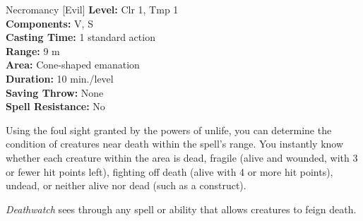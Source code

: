 {Necromancy [Evil]}
{
	\textbf{Level:}
	Clr 1, Tmp 1\\
	\textbf{Components:}
	V, S\\
	\textbf{Casting Time:}
	1 standard action\\
	\textbf{Range:}
	9 m\\
	\textbf{Area:}
	Cone-shaped emanation\\
	\textbf{Duration:}
	10 min./level\\
	\textbf{Saving Throw:}
	None\\
	\textbf{Spell Resistance:}
	No\\
}
{
	Using the foul sight granted by the powers of unlife, you can determine the condition of creatures near death within the spell's range. You instantly know whether each creature within the area is dead, fragile (alive and wounded, with 3 or fewer hit points left), fighting off death (alive with 4 or more hit points), undead, or neither alive nor dead (such as a construct).

	\emph{Deathwatch} sees through any spell or ability that allows creatures to feign death.

}
